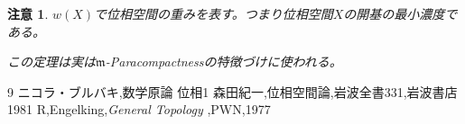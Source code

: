 \documentclass[leqno]{jsarticle}
\newtheorem*{cau}{注意}
\begin{document}
\begin{cau}
$w(X)$で位相空間の重みを表す。つまり位相空間$X$の開基の最小濃度である。\par
この定理は実は$\mathfrak{m}$-Paracompactnessの特徴づけに使われる。
\end{cau}








	
\begin{thebibliography}{9}
ニコラ・ブルバキ,数学原論 位相1
森田紀一,位相空間論,岩波全書331,岩波書店1981
R,Engelking,{\it General Topology },PWN,1977
\end{thebibliography}




			
\end{document}
